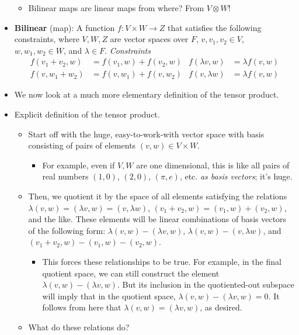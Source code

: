 \documentclass[../notes.tex]{subfiles}
\begin{document}
\begin{itemize}
\begin{itemize}
        \item Bilinear maps are linear maps from where? From $V\otimes W$!
    \end{itemize}
    \item \textbf{Bilinear} (map): A function $f:V\times W\to Z$ that satisfies the following constraints, where $V,W,Z$ are vector spaces over $F$, $v,v_1,v_2\in V$, $w,w_1,w_2\in W$, and $\lambda\in F$. \emph{Constraints}
    \begin{align*}
        f(v_1+v_2,w) &= f(v_1,w)+f(v_2,w)&
            f(\lambda v,w) &= \lambda f(v,w)\\
        f(v,w_1+w_2) &= f(v,w_1)+f(v,w_2)&
            f(v,\lambda w) &= \lambda f(v,w)
    \end{align*}
    \item We now look at a much more elementary definition of the tensor product.
    \item Explicit definition of the tensor product.
    \begin{itemize}
        \item Start off with the huge, easy-to-work-with vector space with basis consisting of pairs of elements $(v,w)\in V\times W$.
        \begin{itemize}
            \item For example, even if $V,W$ are one dimensional, this is like all pairs of real numbers $(1,0)$, $(2,0)$, $(\pi,e)$, etc. \emph{as basis vectors}; it's huge.
        \end{itemize}
        \item Then, we quotient it by the space of all elements satisfying the relations $\lambda(v,w)=(\lambda v,w)=(v,\lambda w)$, $(v_1+v_2,w)=(v_1,w)+(v_2,w)$, and the like. These elements will be linear combinations of basis vectors of the following form: $\lambda(v,w)-(\lambda v,w)$, $\lambda(v,w)-(v,\lambda w)$, and $(v_1+v_2,w)-(v_1,w)-(v_2,w)$.
        \begin{itemize}
            \item This forces these relationships to be true. For example, in the final quotient space, we can still construct the element $\lambda(v,w)-(\lambda v,w)$. But its inclusion in the quotiented-out subspace will imply that in the quotient space, $\lambda(v,w)-(\lambda v,w)=0$. It follows from here that $\lambda(v,w)=(\lambda v,w)$, as desired.
        \end{itemize}
        \item What do these relations do?
        \begin{itemize}

\end{itemize}
\end{itemize}
\end{itemize}
\end{document}
